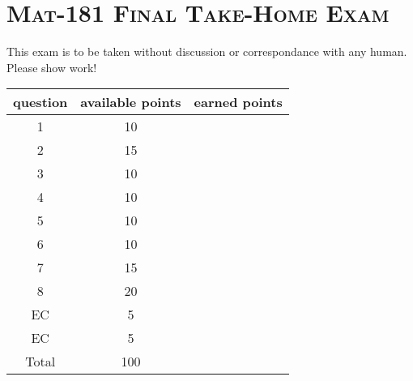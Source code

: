 \documentclass[12pt]{article}
\begin{document}
\thispagestyle{firstpage}

\section*{\textsc{Mat-181 Final Take-Home Exam}}

This exam is to be taken without discussion or correspondance with any human. Please show work!

\vfill
\Large 

\begin{tabular}{|c|c|c|} \hline
question & available points & earned points \\ \hline \hline
1 & 10 & \\ \hline
2 & 15 &  \\ \hline
3 & 10 &  \\ \hline
4 & 10 &  \\ \hline
5 & 10 &  \\ \hline
6 & 10 &  \\ \hline
7 & 15 &  \\ \hline
8 & 20 &  \\ \hline
EC & 5 &  \\ \hline
EC & 5 &  \\ \hline
Total & 100 & \\ \hline
\end{tabular}

\normalsize

\vfill

\newpage

\begin{enumerate}


\end{enumerate}
\end{document}

